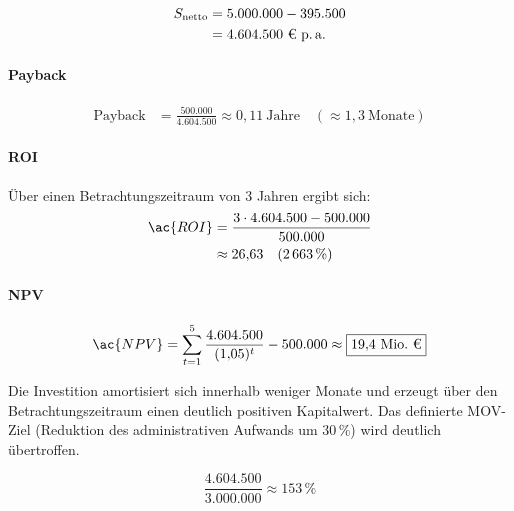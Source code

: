 \begin{align}
S_{\text{netto}} &= 5.000.000 - 395.500 \\
                 &= 4.604.500\ \text{€ p.\,a.}
\end{align}

\paragraph{Payback}

\begin{align}
\text{Payback} &= \frac{500.000}{4.604.500}
\approx 0{,}11\ \text{Jahre} \quad (\approx 1{,}3\ \text{Monate})
\end{align}

\paragraph{ROI}

Über einen Betrachtungszeitraum von 3 Jahren ergibt sich:
\begin{align}
\ac{ROI} &= \frac{3 \cdot 4.604.500 - 500.000}{500.000} \\
         &\approx 26{,}63 \quad (2\,663\,\%)
\end{align}

\paragraph{NPV}

\begin{align}
\ac{NPV} =
\sum_{t=1}^{5}\frac{4.604.500}{(1{,}05)^t}
- 500.000
\approx
\boxed{19{,}4\ \text{Mio.\ €}}
\end{align}

Die Investition amortisiert sich innerhalb weniger Monate und erzeugt über
den Betrachtungszeitraum einen deutlich positiven Kapitalwert. Das
definierte \ac{MOV}-Ziel (Reduktion des administrativen Aufwands um 30\,\%)
wird deutlich übertroffen.

\begin{equation}
\frac{4.604.500}{3.000.000} \approx 153\,\%
\end{equation}

